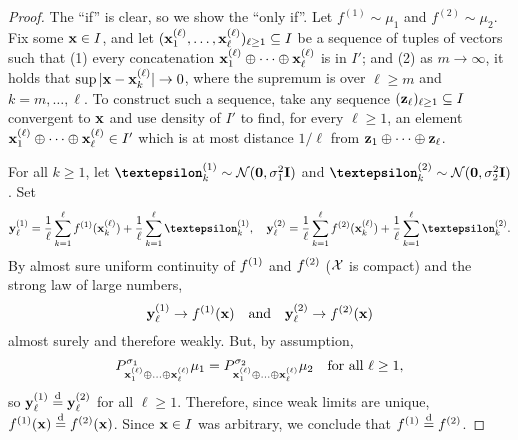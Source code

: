 \documentclass[12pt, twoside]{report}
\begin{document}
\begin{proof}
    The ``if'' is clear, so we show the ``only if''.
    Let $f^{(1)} \sim \mu_1$ and $f^{(2)} \sim \mu_2$.
    Fix some $\mathbf{x} \in I$, and let $(\mathbf{x}^{(\ell)}_1, \ldots, \mathbf{x}^{(\ell)}_\ell)_{\ell \ge 1} \subseteq I$ be a sequence of tuples of vectors such that
    (1) every concatenation $\mathbf{x}^{(\ell)}_1 \oplus \cdots \oplus \mathbf{x}^{(\ell)}_\ell$ is in $I'$; and
    (2) as $m \to \infty$, it holds that $\operatorname*{sup}\, \lvert\mathbf{x} - \mathbf{x}^{(\ell)}_k\rvert \to 0$, where the supremum is over $\ell \ge m$ and $k = m, \ldots, \ell$.
    To construct such a sequence, take any sequence $(\mathbf{z}_{\ell})_{\ell \ge 1} \subseteq I$ convergent to $\mathbf{x}$ and use density of $I'$ to find, for every $\ell \ge 1$, an element $\mathbf{x}^{(\ell)}_1 \oplus \cdots \oplus \mathbf{x}^{(\ell)}_\ell \in I'$ which is at most distance $1/\ell$ from $\mathbf{z}_1 \oplus \cdots \oplus \mathbf{z}_\ell$.

    For all $k \ge 1$,
        let $\vep\us{(1)}_k \sim \Normal(\vnull, \sigma_1^2 \mI)$
        and $\vep\us{(2)}_k \sim \Normal(\vnull, \sigma_2^2 \mI)$.
    Set
    \begin{equation}
        \vy^{(1)}_\ell = \frac1\ell\sum_{k=1}^\ell f\us{(1)}(\vx^{(\ell)}_k) + \frac1\ell\sum^\ell_{k=1}\vep\us{(1)}_k,
        \quad
        \vy^{(2)}_\ell = \frac1\ell\sum_{k=1}^\ell f\us{(2)}(\vx^{(\ell)}_k) + \frac1\ell\sum^\ell_{k=1}\vep\us{(2)}_k.
    \end{equation}
    By almost sure uniform continuity of $f\us{(1)}$ and $f\us{(2)}$ ($\mathcal{X}$ is compact) and the strong law of large numbers,%
    \begin{equation}
        \vy_\ell\us{(1)} \to f\us{(1)}(\vx)
        \quad \text{and} \quad
        \vy_\ell\us{(2)} \to f\us{(2)}(\vx)
    \end{equation}
    almost surely and therefore weakly.
    But, by assumption, 
    \begin{equation}
        P^{\sigma_1}_{\mathbf{x}^{(\ell)}_1 \oplus \ldots \oplus \mathbf{x}_\ell^{(\ell)}} \mu_1
         = P^{\sigma_2}_{\mathbf{x}^{(\ell)}_1 \oplus \ldots \oplus \mathbf{x}_\ell^{(\ell)}} \mu_2
         \quad\text{for all $\ell \ge 1$},
    \end{equation}
    so $\vy\us{(1)}_\ell \disteq \vy\us{(2)}_\ell$ for all $\ell \ge 1$.
    Therefore, since weak limits are unique, $f\us{(1)}(\vx) \disteq f\us{(2)}(\vx)$.
    Since $\mathbf{x} \in I$ was arbitrary, we conclude that $f\us{(1)} \disteq f\us{(2)}$.


\end{proof}
\end{document}
